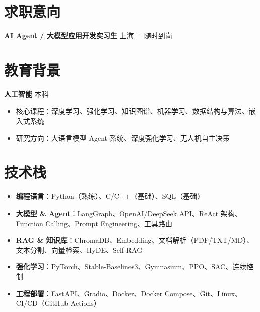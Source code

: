 \documentclass{resume}
\begin{document}

\section{求职意向}
\vspace{-4pt}
\textbf{AI Agent / 大模型应用开发实习生} \hfill 上海 · 随时到岗

\section{教育背景}
\textbf{人工智能} 本科
\begin{itemize}
  \item 核心课程：深度学习、强化学习、知识图谱、机器学习、数据结构与算法、嵌入式系统
  \item 研究方向：大语言模型 Agent 系统、深度强化学习、无人机自主决策
\end{itemize}

\section{技术栈}
\begin{itemize}
  \item \textbf{编程语言}：Python（熟练）、C/C++（基础）、SQL（基础）
  \item \textbf{大模型 \& Agent}：LangGraph、OpenAI/DeepSeek API、ReAct 架构、Function Calling、Prompt Engineering、工具路由
  \item \textbf{RAG \& 知识库}：ChromaDB、Embedding、文档解析（PDF/TXT/MD）、文本分割、向量检索、HyDE、Self-RAG
  \item \textbf{强化学习}：PyTorch、Stable-Baselines3、Gymnasium、PPO、SAC、连续控制
  \item \textbf{工程部署}：FastAPI、Gradio、Docker、Docker Compose、Git、Linux、CI/CD（GitHub Actions）
\end{itemize}
\end{document}
